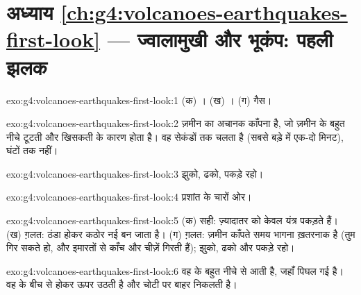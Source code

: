 \section*{अध्याय \ref{ch:g4:volcanoes-earthquakes-first-look} --- ज्वालामुखी और भूकंप: पहली झलक}

\begin{solution}{exo:g4:volcanoes-earthquakes-first-look:1}
(क) । (ख) । (ग) गैस।
\end{solution}

\begin{solution}{exo:g4:volcanoes-earthquakes-first-look:2}
 ज़मीन का अचानक काँपना है, जो ज़मीन के बहुत नीचे टूटती और खिसकती
 के कारण होता है। वह सेकंडों तक चलता है (सबसे बड़े  में एक-दो
मिनट), घंटों तक नहीं।
\end{solution}

\begin{solution}{exo:g4:volcanoes-earthquakes-first-look:3}
झुको, ढको, पकड़े रहो।
\end{solution}

\begin{solution}{exo:g4:volcanoes-earthquakes-first-look:4}
प्रशांत  के चारों ओर।
\end{solution}

\begin{solution}{exo:g4:volcanoes-earthquakes-first-look:5}
(क) सही: ज़्यादातर  को केवल यंत्र पकड़ते हैं। (ख) ग़लत:  ठंडा होकर
कठोर नई  बन जाता है। (ग) ग़लत: ज़मीन काँपते समय भागना ख़तरनाक है (तुम
गिर सकते हो, और इमारतों से काँच और चीज़ें गिरती हैं); झुको, ढको और
पकड़े रहो।
\end{solution}

\begin{solution}{exo:g4:volcanoes-earthquakes-first-look:6}
वह  के बहुत नीचे से आती है, जहाँ  पिघल गई है। वह  के
बीच से होकर ऊपर उठती है और चोटी पर बाहर निकलती है।
\end{solution}

